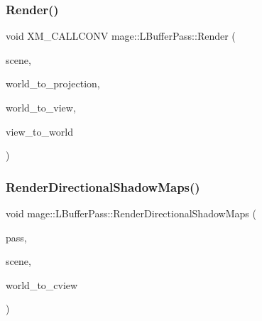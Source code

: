 \hypertarget{structmage_1_1_l_buffer_pass_aceac1e190b0236625b8cc9be5365b043}{}\label{structmage_1_1_l_buffer_pass_aceac1e190b0236625b8cc9be5365b043} 
\subsubsection{\texorpdfstring{Render()}{Render()}}
{\footnotesize\ttfamily void X\+M\+\_\+\+C\+A\+L\+L\+C\+O\+NV mage\+::\+L\+Buffer\+Pass\+::\+Render (\begin{DoxyParamCaption}\item[{const \hyperlink{structmage_1_1_pass_buffer}{Pass\+Buffer} $\ast$}]{scene,  }\item[{F\+X\+M\+M\+A\+T\+R\+IX}]{world\+\_\+to\+\_\+projection,  }\item[{C\+X\+M\+M\+A\+T\+R\+IX}]{world\+\_\+to\+\_\+view,  }\item[{C\+X\+M\+M\+A\+T\+R\+IX}]{view\+\_\+to\+\_\+world }\end{DoxyParamCaption})}

\hypertarget{structmage_1_1_l_buffer_pass_ac6468c170742b5bee823235700ff640d}{}\label{structmage_1_1_l_buffer_pass_ac6468c170742b5bee823235700ff640d} 
\subsubsection{\texorpdfstring{Render\+Directional\+Shadow\+Maps()}{RenderDirectionalShadowMaps()}}
{\footnotesize\ttfamily void mage\+::\+L\+Buffer\+Pass\+::\+Render\+Directional\+Shadow\+Maps (\begin{DoxyParamCaption}\item[{\hyperlink{classmage_1_1_depth_pass}{Depth\+Pass} $\ast$}]{pass,  }\item[{const \hyperlink{structmage_1_1_pass_buffer}{Pass\+Buffer} $\ast$}]{scene,  }\item[{F\+X\+M\+M\+A\+T\+R\+IX}]{world\+\_\+to\+\_\+cview }\end{DoxyParamCaption})\hspace{0.3cm}{\ttfamily [private]}}

\hypertarget{structmage_1_1_l_buffer_pass_a621137906e2c04ddb029d2421c74d14f}{}\label{structmage_1_1_l_buffer_pass_a621137906e2c04ddb029d2421c74d14f} 
